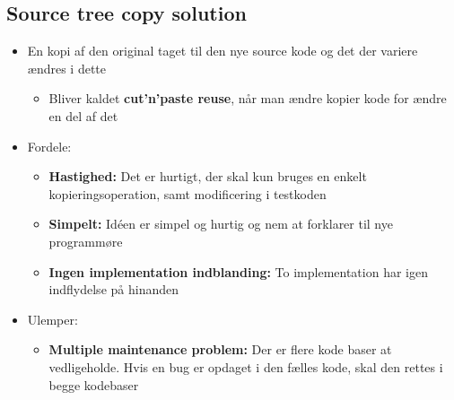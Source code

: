 \documentclass[a4, english]{article}
\begin{document}
\subsection{Source tree copy solution}
\begin{itemize}
	\item En kopi af den original taget til den nye source kode og det der variere ændres i dette 
  \begin{itemize}
  	\item Bliver kaldet \textbf{cut'n'paste reuse}, når man ændre kopier kode for ændre en del af det
  \end{itemize}
  \item Fordele:
  \begin{itemize}
  	\item \textbf{Hastighed:} Det er hurtigt, der skal kun bruges en enkelt kopieringsoperation, samt modificering i testkoden 
    \item \textbf{Simpelt:} Idéen er simpel og hurtig og nem at forklarer til nye programmøre 
    \item \textbf{Ingen implementation indblanding:} To implementation har igen indflydelse på hinanden 
  \end{itemize}
  \item Ulemper:
  \begin{itemize}
  	\item \textbf{Multiple maintenance problem:} Der er flere kode baser at vedligeholde. Hvis en bug er opdaget i den fælles kode, skal den rettes i begge kodebaser 
  \end{itemize}
\end{itemize}
\end{document}
